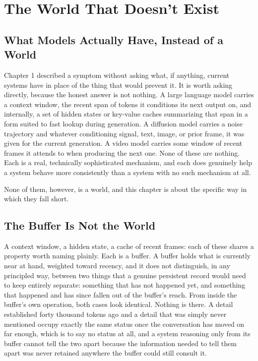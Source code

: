\chapter{The World That Doesn't Exist}

\section{What Models Actually Have, Instead of a World}

Chapter 1 described a symptom without asking what, if anything, current systems have in place of the thing that would prevent it. It is worth asking directly, because the honest answer is not nothing. A large language model carries a context window, the recent span of tokens it conditions its next output on, and internally, a set of hidden states or key-value caches summarizing that span in a form suited to fast lookup during generation. A diffusion model carries a noise trajectory and whatever conditioning signal, text, image, or prior frame, it was given for the current generation. A video model carries some window of recent frames it attends to when producing the next one. None of these are nothing. Each is a real, technically sophisticated mechanism, and each does genuinely help a system behave more consistently than a system with no such mechanism at all.

None of them, however, is a world, and this chapter is about the specific way in which they fall short.

\section{The Buffer Is Not the World}

A context window, a hidden state, a cache of recent frames: each of these shares a property worth naming plainly. Each is a buffer. A buffer holds what is currently near at hand, weighted toward recency, and it does not distinguish, in any principled way, between two things that a genuine persistent record would need to keep entirely separate: something that has not happened yet, and something that happened and has since fallen out of the buffer's reach. From inside the buffer's own operation, both cases look identical. Nothing is there. A detail established forty thousand tokens ago and a detail that was simply never mentioned occupy exactly the same status once the conversation has moved on far enough, which is to say no status at all, and a system reasoning only from its buffer cannot tell the two apart because the information needed to tell them apart was never retained anywhere the buffer could still consult it.

